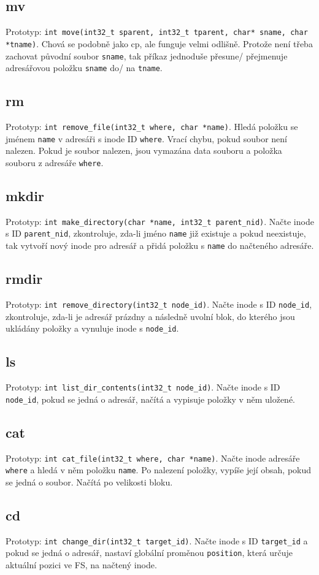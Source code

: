 \documentclass[12pt]{report}
\begin{document}
\subsection{mv}
Prototyp: \texttt{int move(int32\_t sparent, int32\_t tparent, char* sname, char *tname)}. Chová se
podobně jako cp, ale funguje velmi odlišně. Protože není třeba zachovat původní soubor \texttt{sname}, tak příkaz
jednoduše přesune/ přejmenuje adresářovou položku \texttt{sname} do/ na \texttt{tname}.
\subsection{rm}
Prototyp: \texttt{int remove\_file(int32\_t where, char *name)}. Hledá položku se jménem
\texttt{name} v adresáři s inode ID \texttt{where}. Vrací chybu, pokud soubor není nalezen. Pokud je soubor nalezen,
jsou vymazána data souboru a položka souboru z adresáře \texttt{where}.
\subsection{mkdir}
Prototyp: \texttt{int make\_directory(char *name, int32\_t parent\_nid)}. Načte inode s ID \texttt{parent\_nid},
zkontroluje, zda-li jméno \texttt{name} již existuje a pokud neexistuje, tak vytvoří nový inode pro adresář a přidá
položku s \texttt{name} do načteného adresáře.
\subsection{rmdir}
Prototyp: \texttt{int remove\_directory(int32\_t node\_id)}. Načte inode s ID \texttt{node\_id}, zkontroluje,
zda-li je adresář prázdny a následně uvolní blok, do kterého jsou ukládány položky a vynuluje inode s \texttt{node\_id}.
\subsection{ls}
Prototyp: \texttt{int list\_dir\_contents(int32\_t node\_id)}. Načte inode s ID \texttt{node\_id}, pokud se
jedná o adresář, načítá a vypisuje položky v něm uložené.
\subsection{cat}
Prototyp: \texttt{int cat\_file(int32\_t where, char *name)}. Načte inode adresáře \texttt{where} a hledá v něm 
položku \texttt{name}. Po nalezení položky, vypíše její obsah, pokud se jedná o soubor. Načítá po velikosti bloku.
\subsection{cd}
Prototyp: \texttt{int change\_dir(int32\_t target\_id)}. Načte inode s ID \texttt{target\_id} a pokud se jedná
o adresář, nastaví globální proměnou \texttt{position}, která určuje aktuální pozici ve FS, na načtený inode.
\end{document}
